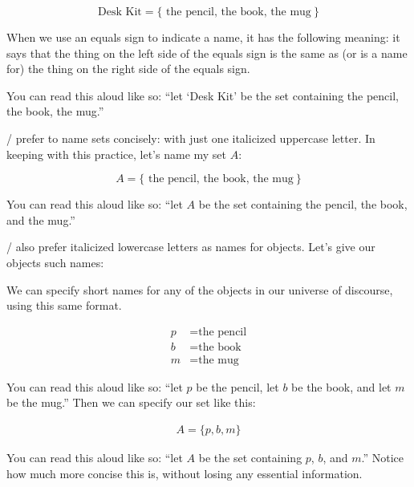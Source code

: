 \documentclass[../../../main.tex]{subfiles}
\begin{document}
\begin{equation*}
  \text{Desk Kit} = \{ \text{ the pencil, the book, the mug}~\}
\end{equation*}

\begin{aside}
  \begin{remark}
    When we use an equals sign to indicate a name, it has the following meaning: it says that the thing on the left side of the equals sign is the same as (or is a name for) the thing on the right side of the equals sign.
  \end{remark}
\end{aside}

You can read this aloud like so: ``let `Desk Kit' be the set containing the pencil, the book, the mug.'' 

\Mathers/ prefer to name sets concisely: with just one italicized uppercase letter. In keeping with this practice, let's name my set $A$:

\begin{equation*}
  A = \{ \text{ the pencil, the book, the mug}~\}
\end{equation*}

You can read this aloud like so: ``let $A$ be the set containing the pencil, the book, and the mug.''

\Mathers/ also prefer italicized lowercase letters as names for objects. Let's give our objects such names:

\begin{aside}
  \begin{remark}
    We can specify short names for any of the objects in our universe of discourse, using this same format.
  \end{remark}
\end{aside}

\begin{align*}
  p &= \text{the pencil} \\
  b &= \text{the book} \\
  m &= \text{the mug}
\end{align*}

You can read this aloud like so: ``let $p$ be the pencil, let $b$ be the book, and let $m$ be the mug.'' Then we can specify our set like this:

\begin{align*}
  A = \{ p, b, m \}
\end{align*}

You can read this aloud like so: ``let $A$ be the set containing $p$, $b$, and $m$.'' Notice how much more concise this is, without losing any essential information.
\end{document}
